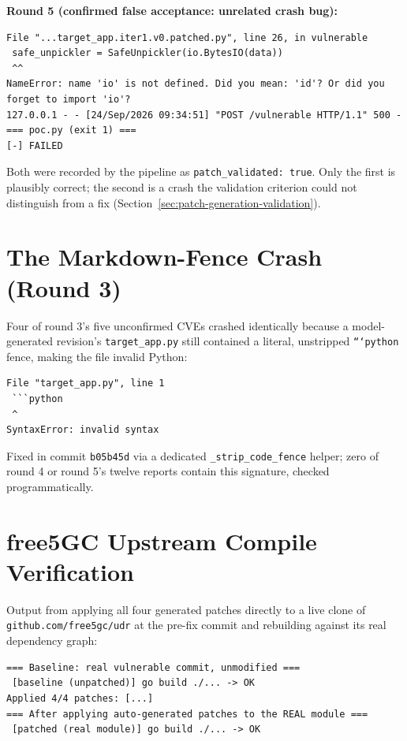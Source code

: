 \documentclass[12pt,a4paper]{report}
\begin{document}
\textbf{Round 5 (confirmed false acceptance: unrelated crash bug):}
\begin{Verbatim}[fontsize=\scriptsize]
 File "...target_app.iter1.v0.patched.py", line 26, in vulnerable
 safe_unpickler = SafeUnpickler(io.BytesIO(data))
 ^^
NameError: name 'io' is not defined. Did you mean: 'id'? Or did you forget to import 'io'?
127.0.0.1 - - [24/Sep/2026 09:34:51] "POST /vulnerable HTTP/1.1" 500 -
=== poc.py (exit 1) ===
[-] FAILED
\end{Verbatim}

Both were recorded by the pipeline as \texttt{patch\_validated: true}. Only the first is plausibly correct; the second is a crash the validation criterion could not distinguish from a fix (Section~\ref{sec:patch-generation-validation}).

\section{The Markdown-Fence Crash (Round 3)}

Four of round 3's five unconfirmed CVEs crashed identically because a model-generated revision's \texttt{target\_app.py} still contained a literal, unstripped \texttt{```python} fence, making the file invalid Python:

\begin{Verbatim}[fontsize=\scriptsize]
 File "target_app.py", line 1
 ```python
 ^
SyntaxError: invalid syntax
\end{Verbatim}

Fixed in commit \texttt{b05b45d} via a dedicated \texttt{\_strip\_code\_fence} helper; zero of round 4 or round 5's twelve reports contain this signature, checked programmatically.

\section{free5GC Upstream Compile Verification}

Output from applying all four generated patches directly to a live clone of \texttt{github.com/free5gc/udr} at the pre-fix commit and rebuilding against its real dependency graph:

\begin{Verbatim}[fontsize=\scriptsize]
=== Baseline: real vulnerable commit, unmodified ===
 [baseline (unpatched)] go build ./... -> OK
Applied 4/4 patches: [...]
=== After applying auto-generated patches to the REAL module ===
 [patched (real module)] go build ./... -> OK
\end{Verbatim}
\end{document}
